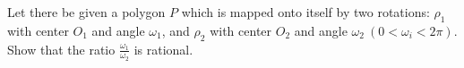 Let there be given a polygon $P$ which is mapped onto itself by two rotations: $\rho_1$ with center $O_1$ and angle $\omega_1$, and $\rho_2$ with center $O_2$ and angle $\omega_2~(0<\omega_i<2\pi)$. Show that the ratio $\frac{\omega_1}{\omega_2}$ is rational.